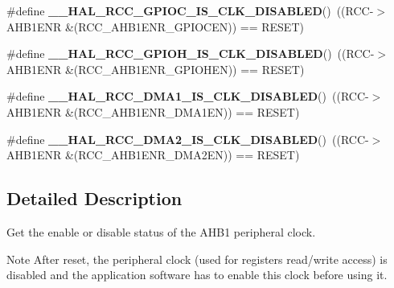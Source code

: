 \begin{DoxyCompactItemize}
\#define {\bfseries \+\_\+\+\_\+\+H\+A\+L\+\_\+\+R\+C\+C\+\_\+\+G\+P\+I\+O\+C\+\_\+\+I\+S\+\_\+\+C\+L\+K\+\_\+\+D\+I\+S\+A\+B\+L\+ED}()~((R\+CC-\/$>$A\+H\+B1\+E\+NR \&(R\+C\+C\+\_\+\+A\+H\+B1\+E\+N\+R\+\_\+\+G\+P\+I\+O\+C\+EN)) == R\+E\+S\+ET)
\item 
\mbox{\label{group___r_c_c___a_h_b1___peripheral___clock___enable___disable___status_ga9c405e3a8e5219c98d0262e18bd0eed9}} 
\#define {\bfseries \+\_\+\+\_\+\+H\+A\+L\+\_\+\+R\+C\+C\+\_\+\+G\+P\+I\+O\+H\+\_\+\+I\+S\+\_\+\+C\+L\+K\+\_\+\+D\+I\+S\+A\+B\+L\+ED}()~((R\+CC-\/$>$A\+H\+B1\+E\+NR \&(R\+C\+C\+\_\+\+A\+H\+B1\+E\+N\+R\+\_\+\+G\+P\+I\+O\+H\+EN)) == R\+E\+S\+ET)
\item 
\mbox{\label{group___r_c_c___a_h_b1___peripheral___clock___enable___disable___status_gae89d94d6252c79e450623f69eb939ed6}} 
\#define {\bfseries \+\_\+\+\_\+\+H\+A\+L\+\_\+\+R\+C\+C\+\_\+\+D\+M\+A1\+\_\+\+I\+S\+\_\+\+C\+L\+K\+\_\+\+D\+I\+S\+A\+B\+L\+ED}()~((R\+CC-\/$>$A\+H\+B1\+E\+NR \&(R\+C\+C\+\_\+\+A\+H\+B1\+E\+N\+R\+\_\+\+D\+M\+A1\+EN)) == R\+E\+S\+ET)
\item 
\mbox{\label{group___r_c_c___a_h_b1___peripheral___clock___enable___disable___status_ga725d2a38d8519867922438d48a5885cf}} 
\#define {\bfseries \+\_\+\+\_\+\+H\+A\+L\+\_\+\+R\+C\+C\+\_\+\+D\+M\+A2\+\_\+\+I\+S\+\_\+\+C\+L\+K\+\_\+\+D\+I\+S\+A\+B\+L\+ED}()~((R\+CC-\/$>$A\+H\+B1\+E\+NR \&(R\+C\+C\+\_\+\+A\+H\+B1\+E\+N\+R\+\_\+\+D\+M\+A2\+EN)) == R\+E\+S\+ET)
\end{DoxyCompactItemize}


\subsection{Detailed Description}
Get the enable or disable status of the A\+H\+B1 peripheral clock. 

\begin{DoxyNote}{Note}
After reset, the peripheral clock (used for registers read/write access) is disabled and the application software has to enable this clock before using it. 
\end{DoxyNote}
